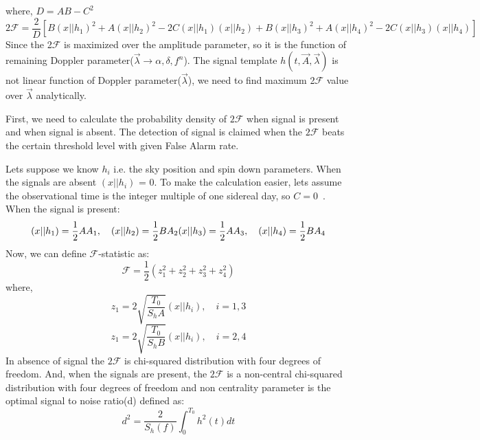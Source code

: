 \documentclass{ttuthes2007}
\begin{document}
where, $D=AB-C^2$
\begin{equation}
2\mathcal{F}=\frac{2}{D}\left[B(x||h_1)^2 + A(x||h_2)^2 -2C(x||h_1)(x||h_2)+
B(x||h_3)^2 + A(x||h_4)^2 -2C(x||h_3)(x||h_4)\right]
\end{equation}
Since the 2$\mathcal{F}$ is maximized over the amplitude parameter, so it is the
function of remaining Doppler parameter($\vec{\lambda}\rightarrow \alpha,\delta,f^n$). The signal
template $h(t,\vec{A},\vec{\lambda})$ is not linear function of Doppler
parameter($\vec{\lambda}$), we need to find maximum 2$\mathcal{F}$ value over
$\vec{\lambda}$ analytically. 

First, we need to calculate the probability density of $2\mathcal{F}$ when
signal is present and when signal is absent. The detection of signal is claimed
when the $2\mathcal{F}$ beats the certain threshold level with given False Alarm
rate. 

Lets suppose we know $h_i$ i.e. the sky position and spin down parameters. When
the signals are absent $(x||h_i)$ = 0. To make the calculation easier, lets
assume the observational time is the integer multiple of one sidereal day, so $C
= 0$~\cite{Jaranowski_2000}. When the signal is present:
\begin{equation}
(x||h_1)= \frac{1}{2}AA_1, \quad (x||h_2) = \frac{1}{2}B A_2\\
(x||h_3)= \frac{1}{2}AA_3, \quad (x||h_4) = \frac{1}{2}B A_4
\end{equation}
Now, we can define $\mathcal{F}$-statistic as:
\begin{equation}
\mathcal{F} = \frac{1}{2}(z_1^2+z_2^2+z_3^2+z_4^2)
\end{equation}
where,
\begin{equation}
z_1=2\sqrt{\frac{T_0}{S_hA}}(x||h_i), \quad i=1,3
\end{equation}
\begin{equation}
z_1=2\sqrt{\frac{T_0}{S_hB}}(x||h_i), \quad i=2,4
\end{equation}
In absence of signal the $2\mathcal{F}$ is chi-squared distribution with four
degrees of freedom. And, when the signals are present, the $2\mathcal{F}$ is a
non-central chi-squared distribution with four degrees of freedom and non
centrality parameter is the optimal signal to noise ratio(d) defined as:
\begin{equation}
d^2=\frac{2}{S_h(f)}\int_0^{T_0} h^2(t)dt
\end{equation}
\end{document}
